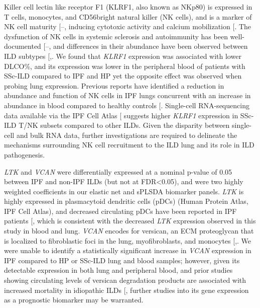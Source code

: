 \documentclass[
]{article}
\begin{document}
Killer cell lectin like receptor F1 (KLRF1, also known as NKp80) is expressed in T cells, monocytes, and CD56bright natural killer (NK cells), and is a marker of NK cell maturity {[}--\citeproc{ref-mukherjee_klrf1_2023}{108}{]}, inducing cytotoxic activity and calcium mobilization {[}\citeproc{ref-vitale_identification_2001}{109}{]}. The dysfunction of NK cells in systemic sclerosis and autoimmunity has been well-documented {[}--\citeproc{ref-liu_nk_2021}{112}{]}, and differences in their abundance have been observed between ILD subtypes {[},\citeproc{ref-bergantini_prognostic_2021}{114}{]}. We found that \textit{KLRF1} expression was associated with lower DLCO\%, and its expression was lower in the peripheral blood of patients with SSc-ILD compared to IPF and HP yet the opposite effect was observed when probing lung expression. Previous reports have identified a reduction in abundance and function of NK cells in IPF lungs concurrent with an increase in abundance in blood compared to healthy controls {[}\citeproc{ref-cruz_reduced_2021}{115}{]}. Single-cell RNA-sequencing data available via the IPF Cell Atlas {[}\citeproc{ref-neumark_idiopathic_2020}{116}{]} suggests higher \textit{KLRF1} expression in SSc-ILD T/NK subsets compared to other ILDs. Given the disparity between single-cell and bulk RNA data, further investigations are required to delineate the mechanisms surrounding NK cell recruitment to the ILD lung and its role in ILD pathogenesis.

\textit{LTK} and \textit{VCAN} were differentially expressed at a nominal p-value of 0.05 between IPF and non-IPF ILDs (but not at FDR\textless0.05), and were two highly weighted coefficients in our elastic net and sPLSDA biomarker panels. \textit{LTK} is highly expressed in plasmacytoid dendritic cells (pDCs) (Human Protein Atlas, IPF Cell Atlas), and decreased circulating pDCs have been reported in IPF patients {[}\citeproc{ref-galati_circulating_2020}{117}{]}, which is consistent with the decreased \textit{LTK} expression observed in this study in blood and lung. \textit{VCAN} encodes for versican, an ECM proteoglycan that is localized to fibroblastic foci in the lung, myofibroblasts, and monocytes {[},\citeproc{ref-bensadoun_proteoglycan_1996}{118}{]}. We were unable to identify a statistically significant increase in \textit{VCAN} expression in IPF compared to HP or SSc-ILD lung and blood samples; however, given its detectable expression in both lung and peripheral blood, and prior studies showing circulating levels of versican degradation products are associated with increased mortality in idiopathic ILDs {[}\citeproc{ref-sand_serological_2018}{119}{]}, further studies into its gene expression as a prognostic biomarker may be warranted.
\end{document}
